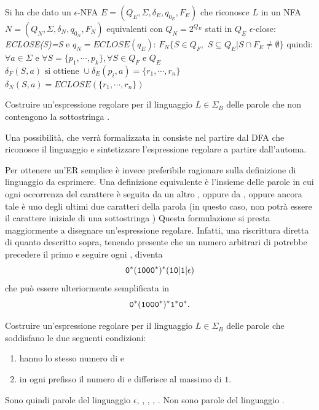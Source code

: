 Si ha che dato un $\epsilon$-NFA $E=(Q_E, \Sigma, \delta_E, q_{0_E}, F_E)$ che riconosce $L$ in un NFA $N=(Q_N, \Sigma, \delta_N, q_{0_N}, F_N)$ equivalenti con $Q_N=2^{Q_E}$ stati in $Q_E$ $\epsilon$-close: \textit{ECLOSE(S)=S} e $q_N=ECLOSE(q_E)$:
$F_N\{S\in Q_F,\,\, S\subseteq Q_E | S\cap F_E\neq \emptyset\}$
quindi:
$\forall a\in \Sigma \text{ e } \forall S=\{p_1,\cdots,p_k\}, \forall S\in Q_F \text{ e } Q_E$
$\delta_F(S,a) \text{ si ottiene }\cup \delta_E(p_i,a)=\{r_1,\cdots, r_n\}$
$\delta_N(S,a)=ECLOSE(\{r_1, \cdots, r_n\})$

\begin{Exercise}\label{exe:no-101-er}
	Costruire un'espressione regolare per il linguaggio $L\in\Sigma_{B}$ delle parole che non contengono la sottostringa \uno\zero\uno.
\end{Exercise}

\begin{Answer}
	Una possibilità, che verrà formalizzata in  consiste nel partire dal DFA che riconosce il
	linguaggio e sintetizzare l'espressione regolare a partire dall'automa.

	Per ottenere un'ER semplice è invece preferibile ragionare sulla definizione di linguaggio da esprimere.
	Una definizione equivalente è l'insieme delle parole in cui ogni occorrenza del carattere \uno è seguita da un
	altro \uno, oppure da \zero\zero, oppure ancora tale \uno è uno degli ultimi due caratteri della parola (in
	questo caso, non potrà essere il carattere iniziale di una sottostringa \uno\zero\uno)
	Questa formulazione si presta maggiormente a disegnare un'espressione regolare.
	Infatti, una riscrittura diretta di quanto descritto sopra, tenendo presente che un numero arbitrari di \zero
	potrebbe precedere il primo \uno e seguire ogni \zero, diventa
	$$\mathtt{0}^{*}(\mathtt{1}\mathtt{0}\mathtt{0}\mathtt{0}^{*})^{*} (\mathtt{1}\mathtt{0} |\mathtt{1} | \epsilon)$$ che può essere ulteriormente
	semplificata in
	$$\mathtt{0}^{*}(\mathtt{1}\mathtt{0}\mathtt{0}\mathtt{0}^{*})^{*} \mathtt{1}^{*} \mathtt{0}^{*}.$$
\end{Answer}



\begin{Exercise}\label{exe:no-diff2-er}
	Costruire un'espressione regolare per il linguaggio $L\in\Sigma_{B}$ delle parole che soddisfano le due seguenti
	condizioni:
	\begin{enumerate}
		\item hanno lo stesso numero di \zero e \uno
		\item in ogni prefisso il numero di \zero e \uno differisce al massimo di $1$.
	\end{enumerate}
	Sono quindi parole del linguaggio $\epsilon$, \zero\uno, \uno\zero, \uno\zero\uno\zero\uno\zero, \zero\uno\zero\uno.
	Non sono parole del linguaggio \uno\uno\zero\zero.
\end{Exercise}

